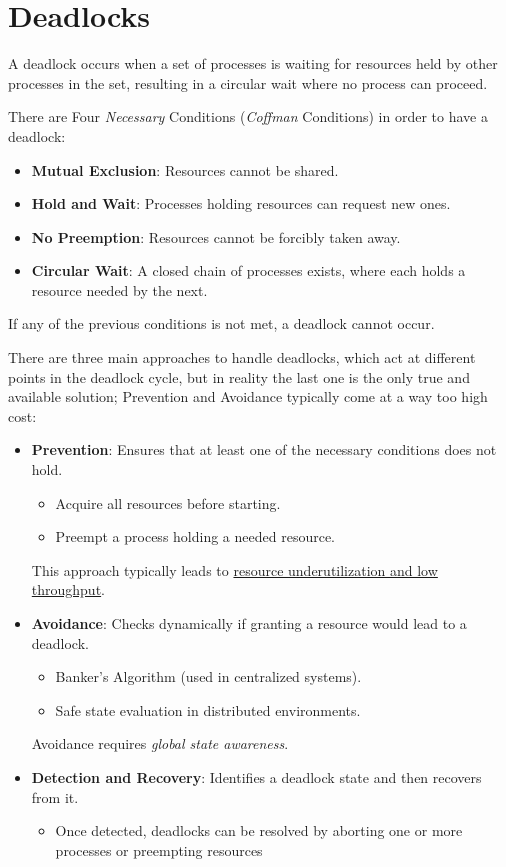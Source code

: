\chapter{Deadlocks}

\begin{definition}
   [Deadlock]
   A deadlock occurs when a set of processes is waiting for resources held by other processes in the set, resulting in a circular wait where no process can proceed.
\end{definition}

{There are Four \textit{Necessary} Conditions (\textit{Coffman} Conditions) in order to have a deadlock:\ns
\begin{itemize}
	\item \textbf{Mutual Exclusion}: Resources cannot be shared.
	\item \textbf{Hold and Wait}: Processes holding resources can request new ones.
	\item \textbf{No Preemption}: Resources cannot be forcibly taken away.
	\item \textbf{Circular Wait}: A closed chain of processes exists, where each holds a resource needed by the next.
\end{itemize}
If any of the previous conditions is not met, a deadlock cannot occur.}

{There are three main approaches to handle deadlocks, which act at different points in the deadlock cycle, but in reality the last one is the only true and available solution; Prevention and Avoidance typically come at a way too high cost:\ns
\begin{itemize}
   \item \textbf{Prevention}: Ensures that at least one of the necessary conditions does not hold.
   \begin{itemize}
      \item Acquire all resources before starting.
      \item Preempt a process holding a needed resource.
   \end{itemize}
   This approach typically leads to \ul{resource underutilization and low throughput}.
   \item \textbf{Avoidance}: Checks dynamically if granting a resource would lead to a deadlock.
   \begin{itemize}
   	\item Banker's Algorithm (used in centralized systems).
	   \item Safe state evaluation in distributed environments.
   \end{itemize}
   Avoidance requires \textit{global state awareness}.
   \item \textbf{Detection and Recovery}: Identifies a deadlock state and then recovers from it.
   \begin{itemize}
      \item Once detected, deadlocks can be resolved by aborting one or more processes or preempting resources
   \end{itemize}
\end{itemize}}

